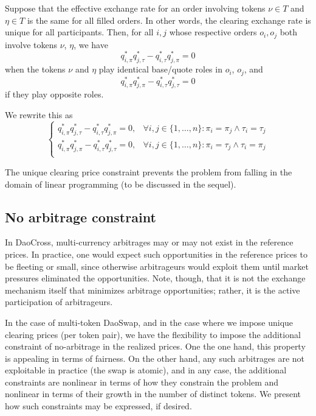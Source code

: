\documentclass[11pt, reqno]{amsart}
\theoremstyle{definition}
\theoremstyle{remark}
\begin{document}
Suppose that the effective exchange rate for an order involving tokens
$\nu \in T$ and $\eta \in T$ is the same for all filled orders. In other words,
the clearing exchange rate is unique for all participants.
Then, for all $i, j$ whose respective orders $o_i, o_j$ both involve tokens
$\nu$, $\eta$, we have
\[
    q_{i, \pi}^* q_{j, \tau}^* - q_{i, \tau}^* q_{j, \pi}^* = 0
\]
when the tokens $\nu$ and $\eta$ play identical base/quote roles in $o_i$,
$o_j$, and
\[
    q_{i, \pi}^* q_{j, \pi}^* - q_{i, \tau}^* q_{j, \tau}^* = 0
\]
if they play opposite roles.

We rewrite this as
\begin{equation}
    \begin{cases}
        q_{i, \pi}^* q_{j, \tau}^* - q_{i, \tau}^* q_{j, \pi}^* = 0, & \forall i, j \in \{1, \ldots, n\}: \pi_i = \pi_j \land \tau_i = \tau_j \\
        q_{i, \pi}^* q_{j, \pi}^* - q_{i, \tau}^* q_{j, \tau}^* = 0, & \forall i, j \in \{1, \ldots, n\}: \pi_i = \tau_j \land \tau_i = \pi_j \\
    \end{cases}
\label{unique_price_constraint}
\end{equation}

The unique clearing price constraint prevents the problem from falling in the
domain of linear programming (to be discussed in the sequel).

\subsection{No arbitrage constraint}
In DaoCross, multi-currency arbitrages may or may not exist in the reference
prices. In practice, one would expect such opportunities in the reference
prices to be fleeting or small, since otherwise arbitrageurs would exploit
them until market pressures eliminated the opportunities. Note, though, that
it is not the exchange mechanism itself that minimizes arbitrage opportunities;
rather, it is the active participation of arbitrageurs.

In the case of multi-token DaoSwap, and in the case where we impose unique
clearing prices (per token pair), we have the flexibility to impose the
additional constraint of no-arbitrage in the realized prices. One the one hand,
this property is appealing in terms of fairness. On the other hand, any such
arbitrages are not exploitable in practice (the swap is atomic), and in any
case, the additional constraints are nonlinear in terms of how they constrain
the problem and nonlinear in terms of their growth in the number of distinct
tokens. We present how such constraints may be expressed, if desired.
\end{document}
